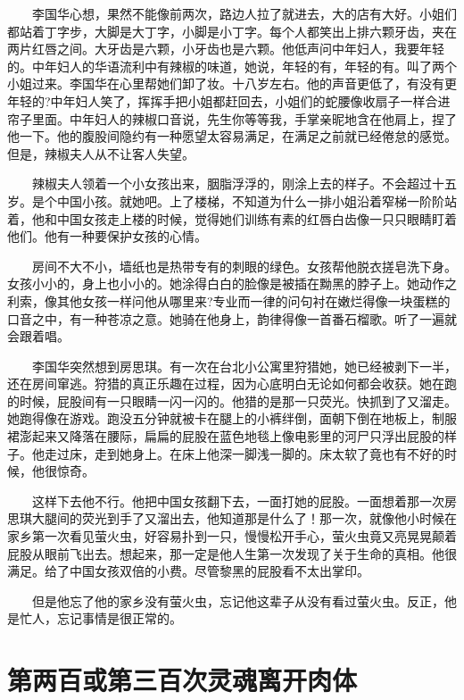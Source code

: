 \documentclass[12pt,UTF8]{ctexbook}
\begin{document}
　　李国华心想，果然不能像前两次，路边人拉了就进去，大的店有大好。小姐们都站着丁字步，大脚是大丁字，小脚是小丁字。每个人都笑出上排六颗牙齿，夹在两片红唇之间。大牙齿是六颗，小牙齿也是六颗。他低声问中年妇人，我要年轻的。中年妇人的华语流利中有辣椒的味道，她说，年轻的有，年轻的有。叫了两个小姐过来。李国华在心里帮她们卸了妆。十八岁左右。他的声音更低了，有没有更年轻的?中年妇人笑了，挥挥手把小姐都赶回去，小姐们的蛇腰像收扇子一样合进帘子里面。中年妇人的辣椒口音说，先生你等等我，手掌亲昵地含在他肩上，捏了他一下。他的腹股间隐约有一种愿望太容易满足，在满足之前就已经倦怠的感觉。但是，辣椒夫人从不让客人失望。

　　辣椒夫人领着一个小女孩出来，胭脂浮浮的，刚涂上去的样子。不会超过十五岁。是个中国小孩。就她吧。上了楼梯，不知道为什么一排小姐沿着窄梯一阶阶站着，他和中国女孩走上楼的时候，觉得她们训练有素的红唇白齿像一只只眼睛盯着他们。他有一种要保护女孩的心情。

　　房间不大不小，墙纸也是热带专有的刺眼的绿色。女孩帮他脱衣搓皂洗下身。女孩小小的，身上也小小的。她涂得白白的脸像是被插在黝黑的脖子上。她动作之利索，像其他女孩一样问他从哪里来?专业而一律的问句衬在嫩烂得像一块蛋糕的口音之中，有一种苍凉之意。她骑在他身上，韵律得像一首番石榴歌。听了一遍就会跟着唱。

　　李国华突然想到房思琪。有一次在台北小公寓里狩猎她，她已经被剥下一半，还在房间窜逃。狩猎的真正乐趣在过程，因为心底明白无论如何都会收获。她在跑的时候，屁股间有一只眼睛一闪一闪的。他猎的是那一只荧光。快抓到了又溜走。她跑得像在游戏。跑没五分钟就被卡在腿上的小裤绊倒，面朝下倒在地板上，制服裙澎起来又降落在腰际，扁扁的屁股在蓝色地毯上像电影里的河尸只浮出屁股的样子。他走过床，走到她身上。在床上他深一脚浅一脚的。床太软了竟也有不好的时候，他很惊奇。

　　这样下去他不行。他把中国女孩翻下去，一面打她的屁股。一面想着那一次房思琪大腿间的荧光到手了又溜出去，他知道那是什么了！那一次，就像他小时候在家乡第一次看见萤火虫，好容易扑到一只，慢慢松开手心，萤火虫竟又亮晃晃颠着屁股从眼前飞出去。想起来，那一定是他人生第一次发现了关于生命的真相。他很满足。给了中国女孩双倍的小费。尽管黎黑的屁股看不太出掌印。

　　但是他忘了他的家乡没有萤火虫，忘记他这辈子从没有看过萤火虫。反正，他是忙人，忘记事情是很正常的。

\hypertarget{ux7b2cux4e24ux767eux6216ux7b2cux4e09ux767eux6b21ux7075ux9b42ux79bbux5f00ux8089ux4f53}{%
\section*{第两百或第三百次灵魂离开肉体}\label{ux7b2cux4e24ux767eux6216ux7b2cux4e09ux767eux6b21ux7075ux9b42ux79bbux5f00ux8089ux4f53}}
\end{document}
